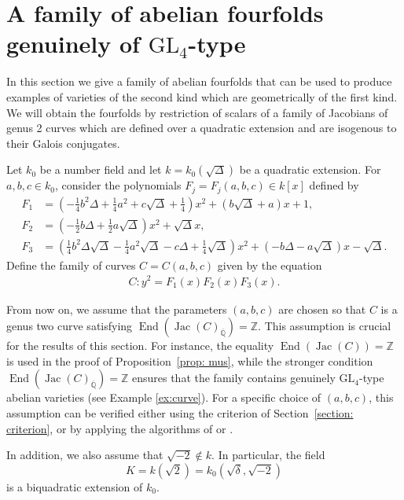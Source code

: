 \documentclass[oneside]{amsart}
\theoremstyle{remark}
\newcommand{\Q}{\mathbb Q}
\newcommand{\Z}{\mathbb Z}
\newcommand{\GL}{\mathrm{GL}}
\newcommand{\End}{\operatorname{End}}
\newcommand{\Jac}{\operatorname{Jac}}
\numberwithin{equation}{section}
\begin{document}
\section{A family of  abelian fourfolds genuinely  of $\GL_4$-type}\label{section:family}
In this section we give a family of abelian fourfolds that can be used to produce examples of varieties of the second kind which are geometrically of the first kind. We will obtain the fourfolds by restriction of scalars of a family of Jacobians of genus 2 curves which are defined over a quadratic extension and are isogenous to their Galois conjugates. 

Let $k_0$ be a number field and let $k=k_0(\sqrt\Delta)$ be a quadratic extension. For $a,b,c\in k_0$, consider the polynomials $F_j=F_j(a,b,c)\in k[x]$ defined by 
\begin{align*}
  F_1 &=  \left(-\frac{1}{4} {b}^{2} {\Delta} + \frac{1}{4} {a}^{2} + {c} {\sqrt{\Delta}} + \frac{1}{4}\right) x^{2} + \left({b} {\sqrt{\Delta}} + {a}\right) x + 1,\\
  F_2 &=  \left(-\frac{1}{2} {b} {\Delta} + \frac{1}{2} {a} {\sqrt{\Delta}}\right) x^{2} + {\sqrt{\Delta}} x, \\
  F_3 &=   \left(\frac{1}{4} {b}^{2} {\Delta} {\sqrt{\Delta}} - \frac{1}{4} {a}^{2} {\sqrt{\Delta}} - {c} {\Delta} + \frac{1}{4} {\sqrt{\Delta}}\right) x^{2} + \left(-{b} {\Delta} - {a} {\sqrt{\Delta}}\right) x - {\sqrt{\Delta}}.
\end{align*}
 Define the family of curves $C = C(a,b,c)$ given by the equation
\begin{align*}
  C\colon y^2 = F_1(x)F_2(x)F_3(x).
\end{align*}

From now on, we assume that the parameters $(a,b,c)$ are chosen so that $C$ is a genus two curve satisfying $\End(\Jac(C)_{\overline{\Q}})=\Z$. This assumption is crucial for the results of this section. For instance, the equality $\End(\Jac(C))=\Z$ is used in the proof of Proposition~\ref{prop: mus}, while the stronger condition $\End(\Jac(C)_{\overline{\Q}})=\Z$ ensures that the family contains genuinely $\GL_4$-type abelian varieties (see Example \ref{ex:curve}). For a specific choice of $(a,b,c)$, this assumption can be verified either using the criterion of Section~\ref{section: criterion}, or by applying the algorithms of \cite{CMSV19} or \cite{Lom19}.

In addition, we also assume that $\sqrt{-2}\not\in k$. In particular, the field $$K = k(\sqrt{2})=k_0(\sqrt{\delta},\sqrt{-2})$$ is a biquadratic extension of $k_0$.
\end{document}

